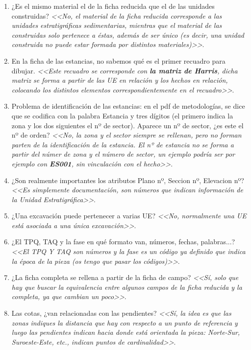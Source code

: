     \begin{enumerate}
        \item ¿Es el mismo material el de la ficha reducida que el de las unidades
        construidas? \textit{<<No, el material de la ficha reducida corresponde a las
        unidades estratigráficas sedimentarias, mientras que el material de las
        construidas solo pertenece a éstas, además de ser único (es decir, una unidad
        construida no puede estar formada por distintos materiales)>>}.
        \item En la ficha de las estancias, no sabemos qué es el primer recuadro para
        dibujar. \textit{<<Este recuadro se corresponde con \textbf{la matriz de Harris},
        dicha matriz se forma a partir de las UE en relación y los hechos en relación,
        colocando los distintos elementos correspondientemente en el recuadro>>}.
        \item Problema de identificación de las estancias: en el pdf de metodologías, 
        se dice que se codifica con la palabra Estancia y tres dígitos (el primero
        indica la zona y los dos siguientes el nº de sector). Aparece un nº de sector,
        ¿es este el nº de orden? \textit{<<No, la zona y el sector siempre se rellenan,
        pero no forman parten de la identificación de la estancia. El nº de estancia
        no se forma a partir del númer de zona y el número de sector, un ejemplo podría
        ser por ejemplo con \textbf{ES001}, sin vinculación con el hecho>>}.
        \item ¿Son realmente importantes los atributos Plano nº, Seccion nº, Elevacion
        nº? \textit{<<Es simplemente documentación, son números que indican información
        de la Unidad Estratigráfica>>}.
        \item ¿Una excavación puede pertenecer a varias UE? \textit{<<No, normalmente una
        UE está asociada a una única excavación>>}.
        \item ¿El TPQ, TAQ y la fase en qué formato van, números, fechas, palabras...?
        \textit{<<El TPQ Y TAQ son números y la fase es un código ya definido que indica
        la época de la pieza (os tengo que pasar los códigos)>>}.
        \item ¿La ficha completa se rellena a partir de la ficha de campo? \textit{<<Sí,
        solo que hay que buscar la equivalencia entre algunos campos de la ficha
        reducida y la completa, ya que cambian un poco>>}.
        \item Las cotas, ¿van relacionadas con las pendientes? \textit{<<Sí, la idea es
        que las zonas indiques la distancia que hay con respecto a un punto de referencia
        y luego las pendientes indican hacia donde está orientada la pieza: Norte-Sur,
        Suroeste-Este, etc., indican puntos de cardinalidad>>}.
    \end{enumerate}

